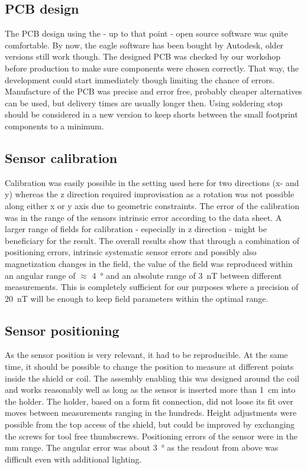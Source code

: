        \subsection{PCB design}
            The PCB design using the - up to that point - open source software was quite comfortable. By now, the eagle software has been bought by Autodesk, older versions still work though. The designed PCB was checked by our workshop before production to make sure components were chosen correctly. That way, the development could start immediately though limiting the chance of errors. Manufacture of the PCB was precise and error free, probably cheaper alternatives can be used, but delivery times are usually longer then. Using soldering stop should be considered in a new version to keep shorts between the small footprint components to a minimum.
        \subsection{Sensor calibration}
            Calibration was easily possible in the setting used here for two directions (x- and y) whereas the z direction required improvisation as a rotation was not possible along either x or y axis due to geometric constraints. The error of the calibration was in the range of the sensors intrinsic error according to the data sheet. A larger range of fields for calibration - especially in z direction - might be beneficiary for the result.
            The overall results show that through a combination of positioning errors, intrinsic systematic sensor errors and possibly also magnetization changes in the field, the value of the field was reproduced within an angular range of $\approx$ \SI{4}{\degree} and an absolute range of \SI{3}{\nano\tesla} between different measurements. This is completely sufficient for our purposes where a precision of \SI{20}{\nano\tesla} will be enough to keep field parameters within the optimal range.
        \subsection{Sensor positioning}
            As the sensor position is very relevant, it had to be reproducible. At the same time, it should be possible to change the position to measure at different points inside the shield or coil. The assembly enabling this was designed around the coil and works reasonably well as long as the sensor is inserted more than \SI{1}{\centi\meter} into the holder. The holder, based on a form fit connection, did not loose its fit over moves between measurements ranging in the hundreds. Height adjustments were possible from the top access of the shield, but could be improved by exchanging the screws for tool free thumbscrews. Positioning errors of the sensor were in the \si{\milli\meter} range. The angular error was about \SI{3}{\degree} as the readout from above was difficult even with additional lighting.

